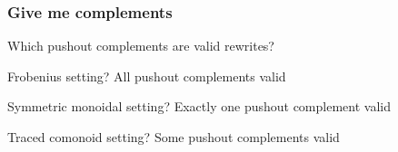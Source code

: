 \begin{frame}
    \frametitle{Give me complements}

    \centering
    \LARGE
    Which pushout complements are \alert{valid} rewrites?

    \pause
    \large
    \alert{Frobenius} setting? \alert{All} pushout complements valid

    \scalebox{0.5}{\hypergraphpeople}

    \pause
    \alert{Symmetric monoidal} setting? \alert{Exactly one} pushout complement valid

    \scalebox{0.5}{\hypergraphpeople}

    \pause
    \alert{Traced comonoid} setting? \alert{Some} pushout complements valid

    \scalebox{0.5}{\meanddan}

\end{frame}

